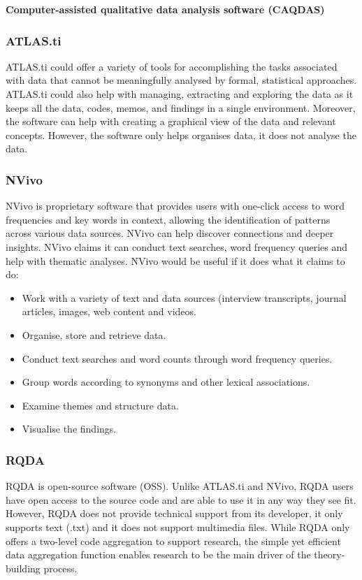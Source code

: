 \documentclass{article}
\begin{document}
\setlength{\parindent}{0em}
\setlength{\parskip}{1em}
\begin{center}
\textbf{Computer-assisted qualitative data analysis software (CAQDAS)}
\end{center}

\subsubsection{ATLAS.ti}
ATLAS.ti could offer a variety of tools for accomplishing the tasks associated with data that cannot be meaningfully analysed by formal, statistical approaches. ATLAS.ti could also help with managing, extracting and exploring the data as it keeps all the data, codes, memos, and findings in a single environment. Moreover, the software can help with creating a graphical view of the data and relevant concepts. However, the software only helps organises data, it does not analyse the data. 

\subsubsection{NVivo}
NVivo is proprietary software that provides users with one-click access to word frequencies and key words in context, allowing the identification of patterns across various data sources. NVivo can help discover connections and deeper insights. NVivo claims it can conduct text searches, word frequency queries and help with thematic analyses. NVivo would be useful if it does what it claims to do:
\begin{itemize}
    \item Work with a variety of text and data sources (interview transcripts, journal articles, images, web content and videos.
    \item Organise, store and retrieve data.
    \item Conduct text searches and word counts through word frequency queries. 
    \item Group words according to synonyms and other lexical associations.
    \item Examine themes and structure data.
    \item Visualise the findings.
\end{itemize}

\subsubsection{RQDA}
RQDA is open-source software (OSS). Unlike ATLAS.ti and NVivo, RQDA users have open access to the source code and are able to use it in any way they see fit. However, RQDA does not provide technical support from its developer, it only supports text (.txt) and it does not support multimedia files. While RQDA only offers a two-level code aggregation to support research, the simple yet efficient data aggregation function enables research to be the main driver of the theory-building process.
\end{document}

